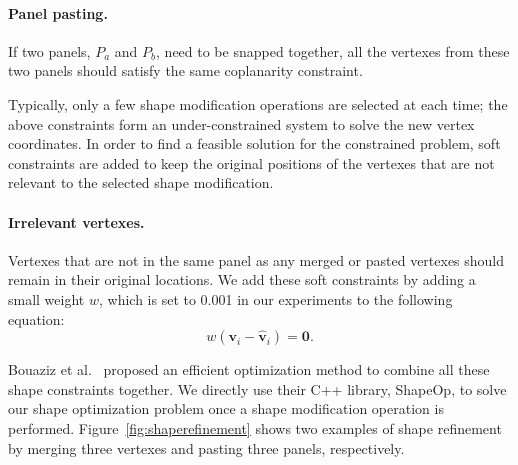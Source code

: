 \paragraph{Panel pasting.} 
If two panels, $P_a$ and $P_b$, need to be snapped together, all the vertexes from these two panels should satisfy the same coplanarity constraint. 
 
Typically, only a few shape modification operations are selected at each time; the above constraints form an under-constrained system to solve the new vertex coordinates. In order to find a feasible solution for the constrained problem, soft constraints are added to keep the original positions of the vertexes that are not relevant to the selected shape modification.

\paragraph{Irrelevant vertexes.} 
Vertexes that are not in the same panel as any merged or pasted vertexes should remain in their original locations.
We add these soft constraints by adding a small weight $w$, which is set to 0.001 in our experiments to the following equation:
\begin{equation}
w(\mathbf{v}_i - \mathbf{\hat{v}}_i) = \mathbf{0}.
\label{equ:irrelevant}
\end{equation}

Bouaziz et al.~\cite{Bouaziz:2012:SSD:2346796.2346802} proposed an efficient optimization method to combine all these shape constraints together. We directly use their C++ library, ShapeOp, to solve our shape optimization problem once a shape modification operation is performed.
Figure~\ref{fig:shaperefinement} shows two examples of shape refinement by merging three vertexes and pasting three panels, respectively. 
 
% 


%

